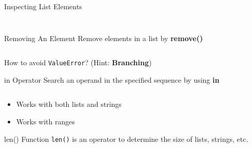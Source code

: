         \begin{frame}{Inspecting List Elements}
            \LARGE
            \inputminted[frame=single,framesep=2pt]{python3}{../Lecture3/code-examples/slicing3.py}
            \inputminted[frame=single,framesep=2pt]{python3}{../Lecture3/code-examples/slicing4.py}
        \end{frame}
   
    
        \begin{frame}{Removing An Element}
            \pause
            \LARGE
            Remove elements in a list by \textbf{remove()}
            \pause              
            \bigskip
            \normalsize
            \inputminted[frame=single,framesep=2pt]{python3}{../Lecture3/code-examples/remove.py}
            \pause
            \LARGE
            How to avoid \texttt{ValueError}? \pause (Hint: \textbf{Branching})
        \end{frame}

        \begin{frame}{in Operator}
            \pause
            \LARGE
            Search an operand in the specified sequence by using \textbf{in}
            \pause
            \bigskip
            \inputminted[frame=single,framesep=2pt]{python3}{../Lecture3/code-examples/in_operator.py}
            \pause
            \begin{itemize}
                \item Works with both lists and strings
                \pause
                \item Works with ranges
            \end{itemize}
        \end{frame}

        \begin{frame}{len() Function}
            \pause
            \LARGE
            \texttt{len()} is an operator to determine the size of lists, strings, etc.
            \pause
            \bigskip
            \inputminted[frame=single,framesep=2pt]{python3}{../Lecture3/code-examples/length.py}
        \end{frame}


